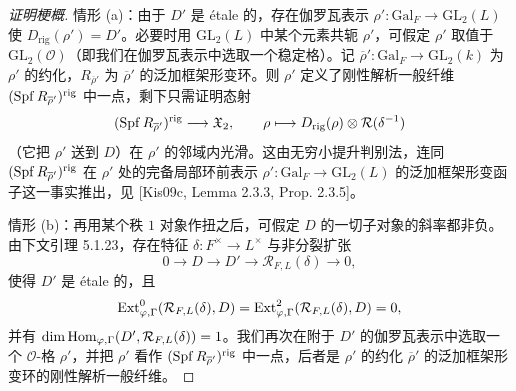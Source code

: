 \begin{proof}[证明梗概]
情形 (a)：由于 $D'$ 是 étale 的，存在伽罗瓦表示 $\rho':\mathrm{Gal}_F\to\mathrm{GL}_2(L)$ 使 $D_{\mathrm{rig}}(\rho')=D'$。必要时用 $\mathrm{GL}_2(L)$ 中某个元素共轭 $\rho'$，可假定 $\rho'$ 取值于 $\mathrm{GL}_2(\mathcal{O})$（即我们在伽罗瓦表示中选取一个稳定格）。记 $\overline{\rho}':\mathrm{Gal}_F\to\mathrm{GL}_2(k)$ 为 $\rho'$ 的约化，$R_{\overline{\rho}'}$ 为 $\overline{\rho}'$ 的泛加框架形变环。则 $\rho'$ 定义了刚性解析一般纤维 $(\operatorname{Spf} R_{\overline{\rho}'})^{\mathrm{rig}}$ 中一点，剩下只需证明态射
\[
(\operatorname{Spf} R_{\overline{\rho}'})^{\mathrm{rig}}\longrightarrow\mathfrak{X}_2,\qquad
\rho\longmapsto D_{\mathrm{rig}}(\rho)\otimes\mathcal{R}(\delta^{-1})
\]
（它把 $\rho'$ 送到 $D$）在 $\rho'$ 的邻域内光滑。这由无穷小提升判别法，连同 $(\operatorname{Spf} R_{\overline{\rho}'})^{\mathrm{rig}}$ 在 $\rho'$ 处的完备局部环前表示 $\rho':\mathrm{Gal}_F\to\mathrm{GL}_2(L)$ 的泛加框架形变函子这一事实推出，见 [Kis09c, Lemma 2.3.3, Prop. 2.3.5]。

情形 (b)：再用某个秩 $1$ 对象作扭之后，可假定 $D$ 的一切子对象的斜率都非负。由下文引理 5.1.23，存在特征 $\delta:F^\times\to L^\times$ 与非分裂扩张
\[
0\longrightarrow D\longrightarrow D'\longrightarrow\mathcal{R}_{F,L}(\delta)\longrightarrow0,
\]
使得 $D'$ 是 étale 的，且
\[
\operatorname{Ext}^0_{\varphi,\Gamma}(\mathcal{R}_{F,L}(\delta),D)=\operatorname{Ext}^2_{\varphi,\Gamma}(\mathcal{R}_{F,L}(\delta),D)=0,
\]
并有 $\dim\operatorname{Hom}_{\varphi,\Gamma}(D',\mathcal{R}_{F,L}(\delta))=1$。我们再次在附于 $D'$ 的伽罗瓦表示中选取一个 $\mathcal{O}$-格 $\rho'$，并把 $\rho'$ 看作 $(\operatorname{Spf} R_{\overline{\rho}'})^{\mathrm{rig}}$ 中一点，后者是 $\rho'$ 的约化 $\overline{\rho}'$ 的泛加框架形变环的刚性解析一般纤维。


\end{proof}
